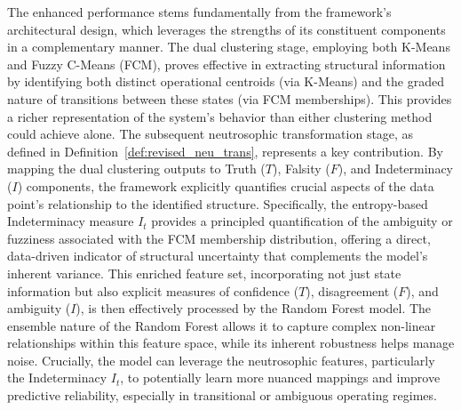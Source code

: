 \documentclass[review,3p,times]{elsarticle}
\begin{document}
The enhanced performance stems fundamentally from the framework's architectural design, which leverages the strengths of its constituent components in a complementary manner. The dual clustering stage, employing both K-Means and Fuzzy C-Means (FCM), proves effective in extracting structural information by identifying both distinct operational centroids (via K-Means) and the graded nature of transitions between these states (via FCM memberships). This provides a richer representation of the system's behavior than either clustering method could achieve alone. The subsequent neutrosophic transformation stage, as defined in Definition~\ref{def:revised_neu_trans}, represents a key contribution. By mapping the dual clustering outputs to Truth ($T$), Falsity ($F$), and Indeterminacy ($I$) components, the framework explicitly quantifies crucial aspects of the data point's relationship to the identified structure. Specifically, the entropy-based Indeterminacy measure $I_t$ provides a principled quantification of the ambiguity or fuzziness associated with the FCM membership distribution, offering a direct, data-driven indicator of structural uncertainty that complements the model's inherent variance. This enriched feature set, incorporating not just state information but also explicit measures of confidence ($T$), disagreement ($F$), and ambiguity ($I$), is then effectively processed by the Random Forest model. The ensemble nature of the Random Forest allows it to capture complex non-linear relationships within this feature space, while its inherent robustness helps manage noise. Crucially, the model can leverage the neutrosophic features, particularly the Indeterminacy $I_t$, to potentially learn more nuanced mappings and improve predictive reliability, especially in transitional or ambiguous operating regimes.
\end{document}
